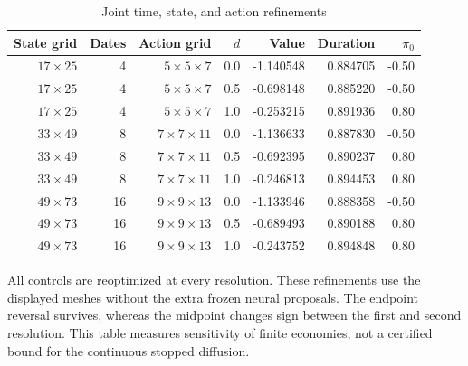 \begin{table}[t]
\centering
\caption{Joint time, state, and action refinements}
\label{tab:r5_joint}
\small
\begin{tabular}{rrrrrrr}
\toprule
State grid & Dates & Action grid & $d$ & Value & Duration & $\pi_0$ \\
\midrule
$17\times25$ & 4 & $5\times5\times7$ & 0.0 & -1.140548 & 0.884705 & -0.50 \\
$17\times25$ & 4 & $5\times5\times7$ & 0.5 & -0.698148 & 0.885220 & -0.50 \\
$17\times25$ & 4 & $5\times5\times7$ & 1.0 & -0.253215 & 0.891936 & 0.80 \\
$33\times49$ & 8 & $7\times7\times11$ & 0.0 & -1.136633 & 0.887830 & -0.50 \\
$33\times49$ & 8 & $7\times7\times11$ & 0.5 & -0.692395 & 0.890237 & 0.80 \\
$33\times49$ & 8 & $7\times7\times11$ & 1.0 & -0.246813 & 0.894453 & 0.80 \\
$49\times73$ & 16 & $9\times9\times13$ & 0.0 & -1.133946 & 0.888358 & -0.50 \\
$49\times73$ & 16 & $9\times9\times13$ & 0.5 & -0.689493 & 0.890188 & 0.80 \\
$49\times73$ & 16 & $9\times9\times13$ & 1.0 & -0.243752 & 0.894848 & 0.80 \\
\bottomrule
\end{tabular}
\par\medskip
\begin{minipage}{.97\linewidth}
\footnotesize All controls are reoptimized at every resolution. These refinements use the displayed meshes without the extra frozen neural proposals. The endpoint reversal survives, whereas the midpoint changes sign between the first and second resolution. This table measures sensitivity of finite economies, not a certified bound for the continuous stopped diffusion.
\end{minipage}
\end{table}
